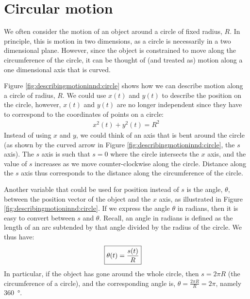 \section{Circular motion}
\label{sec:describingmotioninnd:circularmotion}
We often consider the motion of an object around a circle of fixed radius, $R$. In principle, this is motion in two dimensions, as a circle is necessarily in a two dimensional plane. However, since the object is constrained to move along the circumference of the circle, it can be thought of (and treated as) motion along a one dimensional axis that is curved. 

Figure \ref{fig:describingmotioninnd:circle} shows how we can describe motion along a circle of radius, $R$. We could use $x(t)$ and $y(t)$ to describe the position on the circle, however, $x(t)$ and $y(t)$ are no longer independent since they have to correspond to the coordinates of points on a circle:
\begin{align*}
x^2(t)+y^2(t)=R^2
\end{align*}
Instead of using $x$ and $y$, we could think of an axis that is bent around the circle (as shown by the curved arrow in Figure \ref{fig:describingmotioninnd:circle}, the $s$ axis). The $s$ axis is such that $s=0$ where the circle intersects the $x$ axis, and the value of $s$ increases as we move counter-clockwise along the circle. Distance along the $s$ axis thus corresponds to the distance along the circumference of the circle.

Another variable that could be used for position instead of $s$ is the angle, $\theta$, between the position vector of the object and the $x$ axis, as illustrated in Figure \ref{fig:describingmotioninnd:circle}. If we express the angle $\theta$ in radians, then it is easy to convert between $s$ and $\theta$. Recall, an angle in radians is defined as the length of an arc subtended by that angle divided by the radius of the circle. We thus have:
\begin{align}
\label{eqn:describingmotioninnd:raddef}
\Aboxed{\theta(t)=\frac{s(t)}{R}}
\end{align}
In particular, if the object has gone around the whole circle, then $s=2\pi R$ (the circumference of a circle), and the corresponding angle is, $\theta=\frac{2\pi R}{R}=2\pi$, namely \SI{360}{\degree}. 

